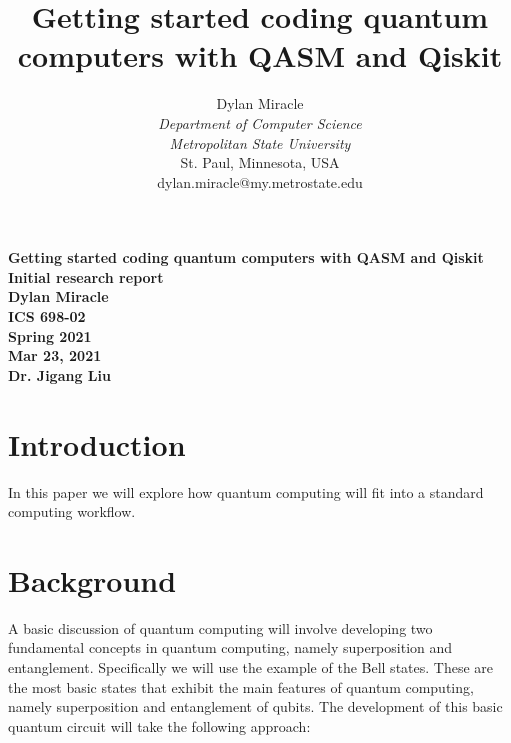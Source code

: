 \documentclass{article}
\begin{document}
\begin{titlepage}
    \begin{center}
        \vspace{4cm}
        \large
        \textbf{
            Getting started coding quantum computers with QASM and Qiskit \\
            Initial research report \\
            Dylan Miracle \\
            ICS 698-02 \\
            Spring 2021 \\
            Mar 23, 2021 \\
            Dr. Jigang Liu
        }
    \end{center}
\end{titlepage}
\title{Getting started coding quantum computers with QASM and Qiskit}

\author{Dylan Miracle\\
\textit{Department of Computer Science} \\
\textit{Metropolitan State University}\\
St. Paul, Minnesota, USA \\
dylan.miracle@my.metrostate.edu
}

\maketitle

\tableofcontents

\section{Introduction}

In this paper we will explore how quantum computing will fit into a standard computing workflow. 

\section{Background}

A basic discussion of quantum computing will involve developing two fundamental concepts in quantum computing, namely superposition and entanglement.
Specifically we will use the example of the Bell states. These are the most basic states that exhibit the main features of quantum computing, namely superposition and entanglement of qubits. The development of this basic quantum circuit will take the following approach:
\end{document}
